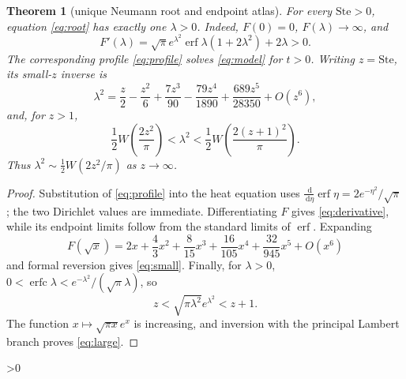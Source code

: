 \documentclass[10pt]{article}
\newtheorem{theorem}{Theorem}
\newcommand{\dd}{\,\mathrm d}
\newcommand{\Ste}{\mathrm{Ste}}
\begin{document}
\begin{theorem}[unique Neumann root and endpoint atlas]\label{thm:main}
For every $\Ste>0$, equation \eqref{eq:root} has exactly one $\lambda>0$.
Indeed, $F(0)=0$, $F(\lambda)\to\infty$, and
\begin{equation}
 F'(\lambda)=\sqrt\pi e^{\lambda^2}\operatorname{erf}\lambda(1+2\lambda^2)+2\lambda>0.
 \label{eq:derivative}
\end{equation}
The corresponding profile \eqref{eq:profile} solves \eqref{eq:model} for $t>0$.
Writing $z=\Ste$, its small-$z$ inverse is
\begin{equation}
 \lambda^2=\frac z2-\frac{z^2}{6}+\frac{7z^3}{90}-\frac{79z^4}{1890}
 +\frac{689z^5}{28350}+O(z^6),
 \label{eq:small}
\end{equation}
and, for $z>1$,
\begin{equation}
 \frac12W\!\left(\frac{2z^2}{\pi}\right)<\lambda^2<
 \frac12W\!\left(\frac{2(z+1)^2}{\pi}\right).
 \label{eq:large}
\end{equation}
Thus $\lambda^2\sim\tfrac12W(2z^2/\pi)$ as $z\to\infty$.
\end{theorem}

\begin{proof}
Substitution of \eqref{eq:profile} into the heat equation uses
$\frac{\dd}{\dd\eta}\operatorname{erf}\eta=2e^{-\eta^2}/\sqrt\pi$;
the two Dirichlet values are immediate. Differentiating $F$ gives
\eqref{eq:derivative}, while its endpoint limits follow from the standard
limits of $\operatorname{erf}$. Expanding
\[
 F(\sqrt x)=2x+\frac43x^2+\frac8{15}x^3+\frac{16}{105}x^4
 +\frac{32}{945}x^5+O(x^6)
\]
and formal reversion gives \eqref{eq:small}. Finally, for $\lambda>0$,
$0<\operatorname{erfc}\lambda<e^{-\lambda^2}/(\sqrt\pi\lambda)$, so
\[
 z<\sqrt{\pi\lambda^2}e^{\lambda^2}<z+1.
\]
The function $x\mapsto\sqrt{\pi x}e^x$ is increasing, and inversion with the
principal Lambert branch proves \eqref{eq:large}.
\end{proof}

\ifnum\CRevisionRound>0
\end{document}
